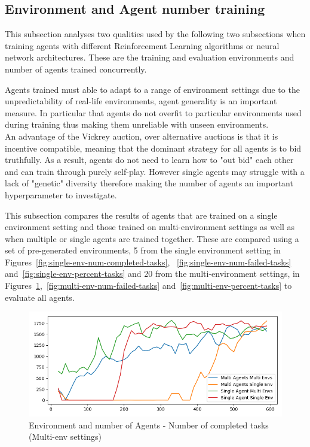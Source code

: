 \subsection{Environment and Agent number training}
\label{subsec:environment-and-agent-number-training}
This subsection analyses two qualities used by the following two subsections when training agents with different
Reinforcement Learning algorithms or neural network architectures. These are the training and evaluation environments
and number of agents trained concurrently.

Agents trained must able to adapt to a range of environment settings due to the unpredictability of real-life
environments, agent generality is an important measure. In particular that agents do not overfit to particular
environments used during training thus making them unreliable with unseen environments. \\
An advantage of the Vickrey auction, over alternative auctions is that it is incentive compatible, meaning that the
dominant strategy for all agents is to bid truthfully. As a result, agents do not need to learn how to "out bid" each
other and can train through purely self-play. However single agents may struggle with a lack of "genetic" diversity
therefore making the number of agents an important hyperparameter to investigate.

This subsection compares the results of agents that are trained on a single environment setting and those trained on
multi-environment settings as well as when multiple or single agents are trained together. These are compared using a
set of pre-generated environments, 5 from the single environment setting in
Figures~\ref{fig:single-env-num-completed-tasks}, ~\ref{fig:single-env-num-failed-tasks}
and~\ref{fig:single-env-percent-tasks} and 20 from the multi-environment settings, in
Figures~\ref{fig:multi-env-num-completed-tasks},~\ref{fig:multi-env-num-failed-tasks}
and~\ref{fig:multi-env-percent-tasks} to evaluate all agents.

\begin{figure}[H]
    \centering
    \includegraphics[width=\linewidth]{figures/5_evaluation_figs/env_agent_num_training_fig/num_completed_tasks.png}
    \caption{Environment and number of Agents - Number of completed tasks (Multi-env settings)}
    \label{fig:multi-env-num-completed-tasks}
\end{figure}

